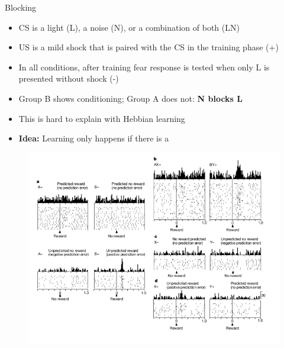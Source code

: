 \begin{frame}{Blocking}{}
	
	
	\footnotesize
	\begin{itemize}
		\item CS is a light (L), a noise (N), or a combination of both (LN)
		\item US is a mild shock that is paired with the CS in the training phase (+)
		\item In all conditions, after training fear response is tested when only L is presented without shock (-)
		\item Group B shows conditioning; Group A does not: \textbf{N blocks L}
		\item This is hard to explain with Hebbian learning
		\item \textbf{Idea:} Learning only happens if there is a 
	\end{itemize}
\end{frame}


\begin{frame}[plain]{}{}
	\begin{figure}
		\centering
		\includegraphics[scale=0.60]{10_deep_learning/02_img/dopamine_prediction_error}
	\end{figure}
\end{frame}


